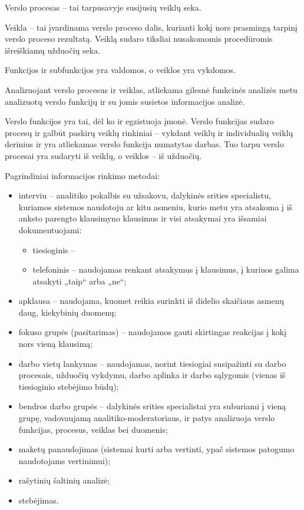 

Verslo procesas – tai tarpusavyje susijusių veiklų seka. 

Veikla – tai įvardinama verslo proceso dalis, kurianti kokį nors
prasmingą tarpinį verslo proceso rezultatą. Veiklą sudaro tiksliai
nusakomomis procedūromis išreiškiamų užduočių seka.

\begin{note}
  Funkcijos ir subfunkcijos yra valdomos, o veiklos yra vykdomos.
\end{note}


Analizuojant verslo procesus ir veiklas, atliekama gilesnė funkcinės
analizės metu analizuotų verslo funkcijų ir su jomis susietos
informacijos analizė.

Verslo funkcijos yra tai, dėl ko ir egzistuoja įmonė. Verslo funkcijas
sudaro procesų ir galbūt paskirų veiklų rinkiniai – vykdant veiklų ir
individualių veiklų derinius ir yra atliekamas verslo funkcija
numatytas darbas. Tuo tarpu verslo procesai yra sudaryti iš veiklų, o
veiklos – iš užduočių.



Pagrindiniai informacijos rinkimo metodai:
\begin{itemize}
  \item interviu – analitiko pokalbis su užsakovu, dalykinės srities
    specialistu, kuriamos sistemos naudotoju ar kitu asmeniu, kurio
    metu yra atsakoma į iš anksto parengto klausimyno klausimus ir
    visi atsakymai yra išsamiai dokumentuojami:
    \begin{itemize}
      \item tiesioginis – 
      \item telefoninis – naudojamas renkant atsakymus į klausimus, į
        kuriuos galima atsakyti „taip“ arba „ne“;
    \end{itemize}
  \item apklausa – naudojama, kuomet reikia surinkti iš didelio skaičiaus
    asmenų daug, kiekybinių duomenų;
  \item fokuso grupės (pasitarimas) – naudojamos gauti skirtingas reakcijas 
    į kokį nors vieną klausimą;
  \item darbo vietų lankymas – naudojamas, norint tiesiogiai susipažinti
    su darbo procesais, užduočių vykdymu, darbo aplinka ir darbo sąlygomis
    (vienas iš tiesioginio stebėjimo būdų);
  \item bendros darbo grupės – dalykinės srities specialistai yra suburiami
    į vieną grupę, vadovaujamą analitiko-moderatoriaus, ir patys analizuoja
    verslo funkcijas, procesus, veiklas bei duomenis;
  \item maketų panaudojimas (sistemai kurti arba vertinti, ypač sistemos
    patogumo naudotojams vertinimui);
  \item rašytinių šaltinių analizė;
  \item stebėjimas.
\end{itemize}

